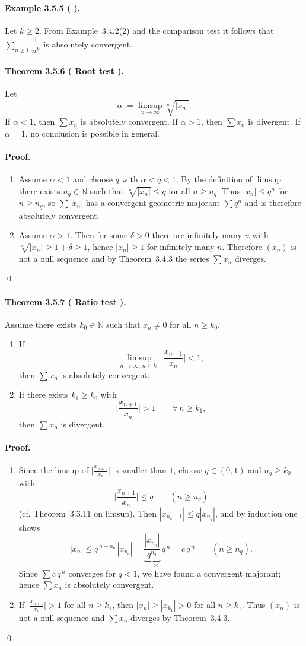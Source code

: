 \documentclass[12pt,a4paper]{article}
\newcommand{\N}{\mathbb{N}}
\newcommand{\NumberedTheorem}[3]{%
\paragraph*{Theorem #1 ( #2 ).} #3\par}
\newcommand{\NumberedExample}[3]{%
\paragraph*{Example #1 ( #2 ).} #3\par}
\theoremstyle{plain}
\theoremstyle{definition}
\theoremstyle{remark}
\begin{document}
\NumberedExample{3.5.5}{}{Let $k\ge2$. From Example~3.4.2(2) and the comparison test it follows that $\sum_{n\ge1} \dfrac{1}{n^k}$ is absolutely convergent.}

\NumberedTheorem{3.5.6}{Root test}{Let
\[
	\alpha := \limsup_{n\to\infty} \sqrt[n]{|x_n|}.
\]
If $\alpha<1$, then $\sum x_n$ is absolutely convergent. If $\alpha>1$, then $\sum x_n$ is divergent. If $\alpha=1$, no conclusion is possible in general.}
\paragraph{Proof.}
\begin{enumerate}[label={(\arabic*)}, leftmargin=*]
	\item Assume $\alpha<1$ and choose $q$ with $\alpha<q<1$. By the definition of $\limsup$ there exists $n_q\in\N$ such that $\sqrt[n]{|x_n|}\le q$ for all $n\ge n_q$. Thus $|x_n|\le q^n$ for $n\ge n_q$, so $\sum |x_n|$ has a convergent geometric majorant $\sum q^n$ and is therefore absolutely convergent.
	\item Assume $\alpha>1$. Then for some $\delta>0$ there are infinitely many $n$ with $\sqrt[n]{|x_n|}\ge 1+\delta \ge 1$, hence $|x_n|\ge1$ for infinitely many $n$. Therefore $(x_n)$ is not a null sequence and by Theorem~3.4.3 the series $\sum x_n$ diverges.
\end{enumerate}
\qed

\NumberedTheorem{3.5.7}{Ratio test}{Assume there exists $k_0\in\N$ such that $x_n\ne0$ for all $n\ge k_0$.
\begin{enumerate}[label={(\arabic*)}, leftmargin=*]
	\item If
	\[
		\limsup_{n\to\infty,\, n\ge k_0} \Bigg|\frac{x_{n+1}}{x_n}\Bigg| < 1,
	\]
	then $\sum x_n$ is absolutely convergent.
	\item If there exists $k_1\ge k_0$ with
	\[
		\Bigg|\frac{x_{n+1}}{x_n}\Bigg| > 1 \qquad \forall\, n\ge k_1,
	\]
	then $\sum x_n$ is divergent.
\end{enumerate}}
\paragraph{Proof.}
\begin{enumerate}[label={(\arabic*)}, leftmargin=*]
	\item Since the limsup of $\big|\tfrac{x_{n+1}}{x_n}\big|$ is smaller than $1$, choose $q\in(0,1)$ and $n_q\ge k_0$ with
	\[
		\Bigg|\frac{x_{n+1}}{x_n}\Bigg| \le q \qquad (n\ge n_q)
	\]
	(cf. Theorem~3.3.11 on limsup). Then $|x_{n_q+1}|\le q|x_{n_q}|$, and by induction one shows
	\[
		|x_n| \le q^{\,n-n_q}\,|x_{n_q}| = \underbrace{\frac{|x_{n_q}|}{q^{n_q}}}_{=:c}\, q^{\,n} = c\,q^{\,n} \qquad (n\ge n_q).
	\]
	Since $\sum c\,q^{\,n}$ converges for $q<1$, we have found a convergent majorant; hence $\sum x_n$ is absolutely convergent.
	\item If $\big|\tfrac{x_{n+1}}{x_n}\big|>1$ for all $n\ge k_1$, then $|x_n|\ge |x_{k_1}|>0$ for all $n\ge k_1$. Thus $(x_n)$ is not a null sequence and $\sum x_n$ diverges by Theorem~3.4.3.
\end{enumerate}
\qed
\end{document}

